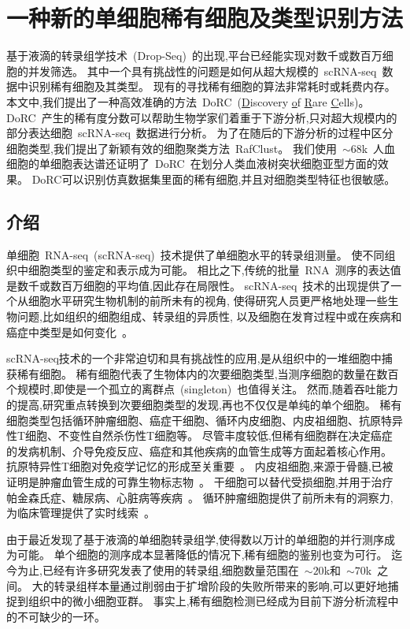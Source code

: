 \section{一种新的单细胞稀有细胞及类型识别方法}

基于液滴的转录组学技术~(Drop-Seq)~的出现,平台已经能实现对数千或数百万细胞的并发筛选。
其中一个具有挑战性的问题是如何从超大规模的~scRNA-seq~数据中识别稀有细胞及其类型。
现有的寻找稀有细胞的算法非常耗时或耗费内存。
本文中,我们提出了一种高效准确的方法~DoRC~(\underline{D}iscovery \underline{o}f \underline{R}are \underline{C}ells)。
DoRC~产生的稀有度分数可以帮助生物学家们着重于下游分析,只对超大规模内的部分表达细胞~scRNA-seq~数据进行分析。
为了在随后的下游分析的过程中区分细胞类型,我们提出了新颖有效的细胞聚类方法~RafClust。
我们使用~${\sim}68$k~人血细胞的单细胞表达谱还证明了~DoRC~在划分人类血液树突状细胞亚型方面的效果。
DoRC可以识别仿真数据集里面的稀有细胞,并且对细胞类型特征也很敏感。

\subsection{介绍}
单细胞~RNA-seq~(scRNA-seq)~技术提供了单细胞水平的转录组测量。
使不同组织中细胞类型的鉴定和表示成为可能。
相比之下,传统的批量~RNA~测序的表达值是数千或数百万细胞的平均值,因此存在局限性。
scRNA-seq~技术的出现提供了一个从细胞水平研究生物机制的前所未有的视角,
使得研究人员更严格地处理一些生物问题,比如组织的细胞组成、转录组的异质性,
以及细胞在发育过程中或在疾病和癌症中类型是如何变化~\cite{kumar2017understanding,patel2014single}。

scRNA-seq技术的一个非常迫切和具有挑战性的应用,是从组织中的一堆细胞中捕获稀有细胞。
稀有细胞代表了生物体内的次要细胞类型,当测序细胞的数量在数百个规模时,即使是一个孤立的离群点~(singleton)~也值得关注。
然而,随着吞吐能力的提高,研究重点转换到次要细胞类型的发现,再也不仅仅是单纯的单个细胞。
稀有细胞类型包括循环肿瘤细胞、癌症干细胞、循环内皮细胞、内皮祖细胞、抗原特异性T细胞、不变性自然杀伤性T细胞等。
尽管丰度较低,但稀有细胞群在决定癌症的发病机制、介导免疫反应、癌症和其他疾病的血管生成等方面起着核心作用。
抗原特异性T细胞对免疫学记忆的形成至关重要~\cite{slansky2003antigen,altman1996phenotypic,manzo2015antigen}。
内皮祖细胞,来源于骨髓,已被证明是肿瘤血管生成的可靠生物标志物~\cite{kuo2012dynamics,cima2016tumor}。
干细胞可以替代受损细胞,并用于治疗帕金森氏症、糖尿病、心脏病等疾病~\cite{jang2005stem}。
循环肿瘤细胞提供了前所未有的洞察力,为临床管理提供了实时线索~\cite{krebs2010circulating}。

由于最近发现了基于液滴的单细胞转录组学,使得数以万计的单细胞的并行测序成为可能。
单个细胞的测序成本显著降低的情况下,稀有细胞的鉴别也变为可行。
迄今为止,已经有许多研究发表了使用的转录组,细胞数量范围在~${\sim} 20$k和~${\sim} 70$k~之间。
大的转录组样本量通过削弱由于扩增阶段的失败所带来的影响,可以更好地捕捉到组织中的微小细胞亚群。
事实上,稀有细胞检测已经成为目前下游分析流程中的不可缺少的一环。

